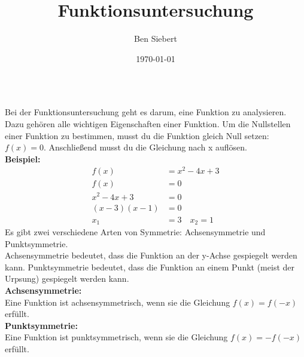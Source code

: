 \documentclass[25pt, a3paper, portrait]{tikzposter}
\title{Funktionsuntersuchung}
\author{Ben Siebert}
\date{\today}
\institute{Gymnasium Holthausen Hattingen}
\begin{document}
    \maketitle
    \begin{columns}
        {Bei der Funktionsuntersuchung geht es darum, eine Funktion zu analysieren.
        Dazu gehören alle wichtigen Eigenschaften einer Funktion.
        }
        {
            Um die Nullstellen einer Funktion zu bestimmen, musst du die Funktion gleich Null setzen: $f(x) = 0$.
        Anschließend musst du die Gleichung nach x auflösen. \\
        \textbf{Beispiel:}
            \begin{align*}
                f(x) &= x^2 - 4x + 3\\
                f(x) &= 0\\
                x^2 - 4x + 3 &= 0\\
                (x - 3)(x - 1) &= 0\\
                x_1 &= 3 \quad x_2 = 1
            \end{align*}
        }
        {
            Es gibt zwei verschiedene Arten von Symmetrie: Achsensymmetrie und Punktsymmetrie. \\
            Achsensymmetrie bedeutet, dass die Funktion an der y-Achse gespiegelt werden kann.
        Punktsymmetrie bedeutet, dass die Funktion an einem Punkt (meist der Urpsung) gespiegelt werden kann. \\
        \textbf{Achsensymmetrie:} \\
        Eine Funktion ist achsensymmetrisch, wenn sie die Gleichung $f(x) = f(-x)$ erfüllt. \\
        \textbf{Punktsymmetrie:} \\
        Eine Funktion ist punktsymmetrisch, wenn sie die Gleichung $f(x) = -f(-x)$ erfüllt. \\
        }
    \end{columns}
\end{document}
